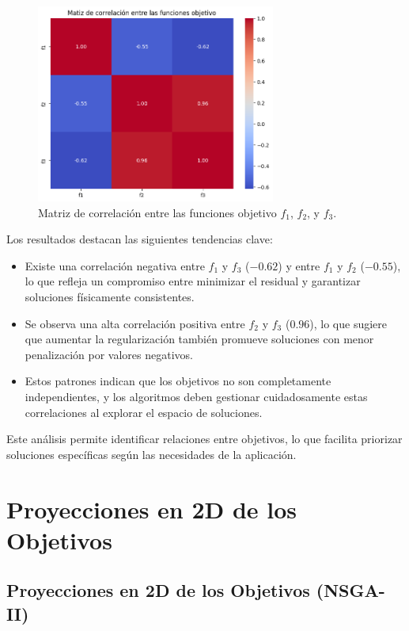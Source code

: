 \begin{figure}[H]
    \centering
    \includegraphics[width=0.7\textwidth]{Images/correlation_matrix.png}
    \caption{Matriz de correlación entre las funciones objetivo \( f_1 \), \( f_2 \), y \( f_3 \).}
    \label{fig:correlation_matrix}
\end{figure}

Los resultados destacan las siguientes tendencias clave:
\begin{itemize}
    \item Existe una correlación negativa entre \( f_1 \) y \( f_3 \) (\(-0.62\)) y entre \( f_1 \) y \( f_2 \) (\(-0.55\)), lo que refleja un compromiso entre minimizar el residual y garantizar soluciones físicamente consistentes.
    \item Se observa una alta correlación positiva entre \( f_2 \) y \( f_3 \) (\(0.96\)), lo que sugiere que aumentar la regularización también promueve soluciones con menor penalización por valores negativos.
    \item Estos patrones indican que los objetivos no son completamente independientes, y los algoritmos deben gestionar cuidadosamente estas correlaciones al explorar el espacio de soluciones.
\end{itemize}

Este análisis permite identificar relaciones entre objetivos, lo que facilita priorizar soluciones específicas según las necesidades de la aplicación.

\section{Proyecciones en 2D de los Objetivos}

\subsection{Proyecciones en 2D de los Objetivos (NSGA-II)}

